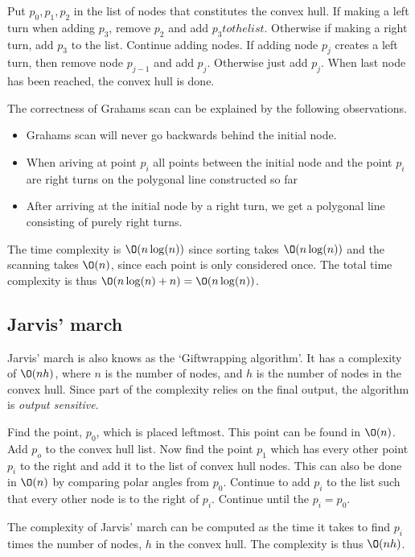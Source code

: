 \documentclass[10pt]{article}
\begin{document}
Put $p_0, p_1, p_2$ in the list of nodes that constitutes the convex hull. If making a left turn when adding $p_3$, remove $p_2$ and add $p_3 to the list$. Otherwise if making a right turn, add $p_3$ to the list. Continue adding nodes. If adding node $p_j$ creates a left turn, then remove node $p_{j-1}$ and add $p_j$. Otherwise just add $p_j$. When last node has been reached, the convex hull is done.

The correctness of Grahams scan can be explained by the following observations. 

\begin{itemize}
  \item Grahams scan will never go backwards behind the initial node. 
  \item When ariving at point $p_i$ all points between the initial node and the point $p_i$ are right turns on the polygonal line constructed so far
  \item After arriving at the initial node by a right turn, we get a polygonal line consisting of purely right turns. 
\end{itemize}



The time complexity is $\O(n\log(n))$ since sorting takes $\O(n\log(n))$ and the scanning takes $\O(n)$, since each point is only considered once. The total time complexity is thus $\O(n\log(n)+n)=\O(n\log(n))$.


\subsection{Jarvis' march} %
\label{sub:jarvis_march}
Jarvis' march is also knows as the `Giftwrapping algorithm'. It has a complexity of $\O(nh)$, where $n$ is the number of nodes, and $h$ is the number of nodes in the convex hull. Since part of the complexity relies on the final output, the algorithm is \emph{output sensitive}.

Find the point, $p_0$, which is placed leftmost. This point can be found in $\O(n)$. Add $p_o$ to the convex hull list. Now find the point $p_1$ which has every other point $p_i$ to the right and add it to the list of convex hull nodes. This can also be done in $\O(n)$ by comparing polar angles from $p_0$. Continue to add $p_i$ to the list such that every other node is to the right of $p_i$. Continue until the $p_i=p_0$.

The complexity of Jarvis' march can be computed as the time it takes to find $p_i$ times the number of nodes, $h$ in the convex hull. The complexity is thus $\O(nh)$.
\end{document}
